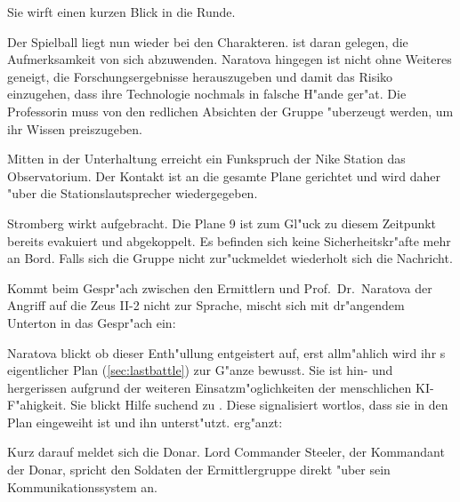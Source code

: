 Sie wirft einen kurzen Blick in die Runde.


Der Spielball liegt nun wieder bei den Charakteren. \xl{} ist daran gelegen, die Aufmerksamkeit von sich abzuwenden. Naratova hingegen ist nicht ohne Weiteres geneigt, die Forschungsergebnisse herauszugeben und damit das Risiko einzugehen, dass ihre Technologie nochmals in falsche H"ande ger"at. Die Professorin muss von den redlichen Absichten der Gruppe "uberzeugt werden, um ihr Wissen preiszugeben.

Mitten in der Unterhaltung erreicht ein Funkspruch der Nike Station das Observatorium. Der Kontakt ist an die gesamte Plane gerichtet und wird daher "uber die Stationslautsprecher wiedergegeben.


Stromberg wirkt aufgebracht. Die Plane 9 ist zum Gl"uck zu diesem Zeitpunkt bereits evakuiert und abgekoppelt. Es befinden sich keine Sicherheitskr"afte mehr an Bord. Falls sich die Gruppe nicht zur"uckmeldet wiederholt sich die Nachricht. 

Kommt beim Gespr"ach zwischen den Ermittlern und Prof.~Dr.~Naratova der Angriff auf die Zeus II-2 nicht zur Sprache, mischt sich \xl{} mit dr"angendem Unterton in das Gespr"ach ein:


Naratova blickt ob dieser Enth"ullung entgeistert auf, erst allm"ahlich wird ihr \xl{}s eigentlicher Plan (\cref{sec:lastbattle}) zur G"anze bewusst. Sie ist hin- und hergerissen aufgrund der weiteren Einsatzm"oglichkeiten der menschlichen KI-F"ahigkeit. Sie blickt Hilfe suchend zu \ml{}. Diese signalisiert wortlos, dass sie in den Plan eingeweiht ist und ihn unterst"utzt. \ml{} erg"anzt:


Kurz darauf meldet sich die Donar. Lord Commander Steeler, der Kommandant der Donar, spricht den Soldaten der Ermittlergruppe direkt "uber sein Kommunikationssystem an.

